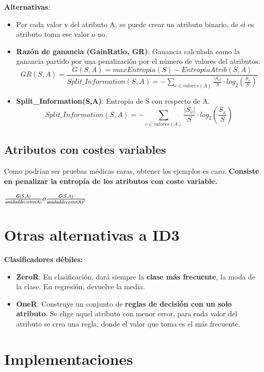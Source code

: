 \documentclass[12pt]{report} %
\begin{document}
\textbf{Alternativas}:

\begin{itemize}

\item
  Por cada valor v del atributo A, se puede crear un atributo binario,
  de si es atributo toma ese valor o no.
\item
  \textbf{Razón de ganancia (GainRatio, GR)}: Ganancia calculada como la
  ganancia partido por una penalización por el número de valores del
  atributos.
  $$
  GR(S,A)= \frac {G(S,A)=max Entropia(S)-EntropiaAtrib(S,A)}{Split\_Information(S,A)=-\sum_{c\in valores(A)} \frac {|S_v|}{S} \cdot log_2(\frac {S_x}{S})}
  $$
\item
  \textbf{Split\_Information(S,A)}: Entropía de S con respecto de A.
  $$
  Split\_Information(S,A)=-\sum_{c\in valores(A)} \frac {|S_v|}{S} \cdot log_2(\frac {S_x}{S}) 
  $$
\end{itemize}

\subsection{Atributos con costes
variables}

Como podrían ser pruebas médicas caras, obtener los ejemplos es caro.
\textbf{Consiste en penalizar la entropía de los atributos con coste
variable.}

\(\frac {G(S,A)}{unidad \space de \space coste(A)} o \frac {G(S,A)}{unidad \space de \space coste(A)^2}\)

\section{Otras alternativas a ID3}

\textbf{Clasificadores débiles:}

\begin{itemize}

\item
  \textbf{ZeroR}: En clasificación, dará siempre la \textbf{clase más
  frecuente}, la moda de la clase. En regresión, devuelve la media.
\item
  \textbf{OneR}: Construye un conjunto de \textbf{reglas de decisión con
  un solo atributo}. Se elige aquel atributo con menor error, para cada
  valor del atributo se crea una regla, donde el valor que toma es el
  más frecuente.
\end{itemize}

\section{Implementaciones}
\end{document}
